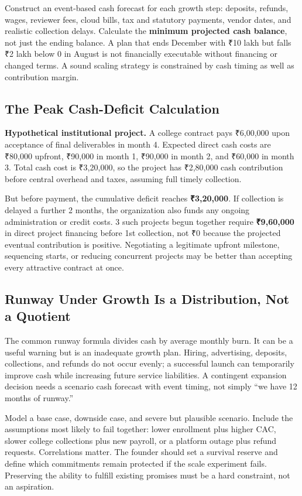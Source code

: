 Construct an event-based cash forecast for each growth step: deposits, refunds, wages, reviewer fees, cloud bills, tax and statutory payments, vendor dates, and realistic collection delays. Calculate the \textbf{minimum projected cash balance}, not just the ending balance. A plan that ends December with ₹10 lakh but falls ₹2 lakh below 0 in August is not financially executable without financing or changed terms. A sound scaling strategy is constrained by cash timing as well as contribution margin.

\subsection{The Peak Cash-Deficit Calculation}
\label{sec:peak_cash_deficit_calculation}

\textbf{Hypothetical institutional project.} A college contract pays ₹6,00,000 upon acceptance of final deliverables in month 4. Expected direct cash costs are ₹80,000 upfront, ₹90,000 in month 1, ₹90,000 in month 2, and ₹60,000 in month 3. Total cash cost is ₹3,20,000, so the project has ₹2,80,000 cash contribution before central overhead and taxes, assuming full timely collection.

But before payment, the cumulative deficit reaches \textbf{₹3,20,000}. If collection is delayed a further 2 months, the organization also funds any ongoing administration or credit costs. 3 such projects begun together require \textbf{₹9,60,000} in direct project financing before 1st collection, not ₹0 because the projected eventual contribution is positive. Negotiating a legitimate upfront milestone, sequencing starts, or reducing concurrent projects may be better than accepting every attractive contract at once.

\subsection{Runway Under Growth Is a Distribution, Not a Quotient}
\label{sec:runway_distribution_under_growth}

The common runway formula divides cash by average monthly burn. It can be a useful warning but is an inadequate growth plan. Hiring, advertising, deposits, collections, and refunds do not occur evenly; a successful launch can temporarily improve cash while increasing future service liabilities. A contingent expansion decision needs a scenario cash forecast with event timing, not simply ``we have 12 months of runway.''

Model a base case, downside case, and severe but plausible scenario. Include the assumptions most likely to fail together: lower enrollment plus higher CAC, slower college collections plus new payroll, or a platform outage plus refund requests. Correlations matter. The founder should set a survival reserve and define which commitments remain protected if the scale experiment fails. Preserving the ability to fulfill existing promises must be a hard constraint, not an aspiration.

